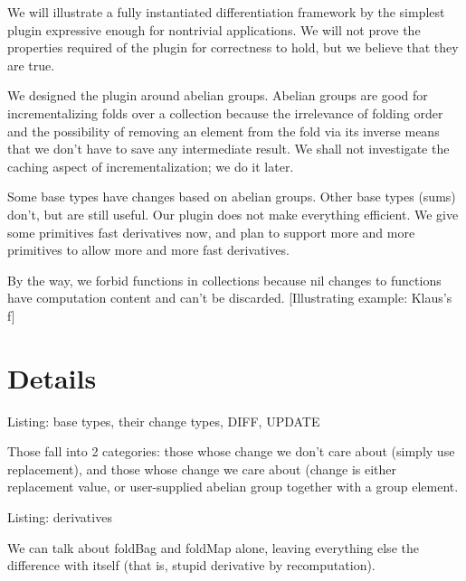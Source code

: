 \begin{oldSec}
We will illustrate a fully instantiated differentiation framework
by the simplest plugin expressive enough for nontrivial
applications. We will not prove the properties required of the
plugin for correctness to hold, but we believe that they are
true.

We designed the plugin around abelian groups.
Abelian groups are good for incrementalizing folds over a
collection because the irrelevance of folding order and the
possibility of removing an element from the fold via its inverse
means that we don't have to save any intermediate result. We
shall not investigate the caching aspect of incrementalization;
we do it later.

Some base types have changes based on abelian groups. Other base
types (sums) don't, but are still useful. Our plugin does not
make everything efficient. We give some primitives fast
derivatives now, and plan to support more and more primitives to
allow more and more fast derivatives.

By the way, we forbid functions in collections because nil
changes to functions have computation content and can't be
discarded. [Illustrating example: Klaus's f]

\section*{Details}

Listing: base types, their change types, DIFF, UPDATE

Those fall into 2 categories: those whose change we don't care
about (simply use replacement), and those whose change we care
about (change is either replacement value, or user-supplied
abelian group together with a group element.

Listing: derivatives

We can talk about foldBag and foldMap alone, leaving
everything else the difference with itself (that is, stupid
derivative by recomputation).
\end{oldSec}

